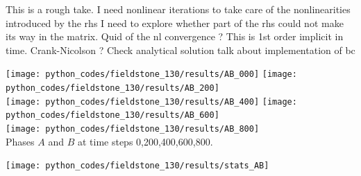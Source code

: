 This is a rough take.
I need nonlinear iterations to take care of the nonlinearities introduced by the rhs
I need to explore whether part of the rhs could not make its way in the matrix. 
Quid of the nl convergence ?
This is 1st order implicit in time. Crank-Nicolson ?
Check analytical solution 
talk about implementation of bc

\begin{center}
\texttt{[image: python\_codes/fieldstone\_130/results/AB\_000]}
\texttt{[image: python\_codes/fieldstone\_130/results/AB\_200]}\\
\texttt{[image: python\_codes/fieldstone\_130/results/AB\_400]}
\texttt{[image: python\_codes/fieldstone\_130/results/AB\_600]}\\
\texttt{[image: python\_codes/fieldstone\_130/results/AB\_800]}\\
{\captionfont Phases $A$ and $B$ at time steps 0,200,400,600,800.}
\end{center}


\begin{center}
\texttt{[image: python\_codes/fieldstone\_130/results/stats\_AB]}
\end{center}
